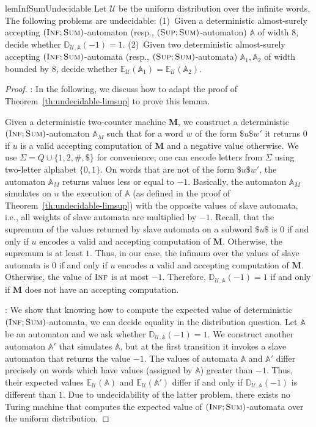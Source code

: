 \documentclass{lmcs}
\newcommand{\Paragraph}[1]{\noindent{\textbf{#1}}}
\newcommand{\nestedA}{\mathbb{A}}
\newcommand{\fsum}{\textsc{Sum}}
\newcommand{\fsup}{\textsc{Sup}}
\newcommand{\finf}{\textsc{Inf}}
\newcommand{\expected}{\mathbb{E}}
\newcommand{\distrib}{\mathbb{D}}
\newcommand{\calU}{\mathcal{U}}
\newcommand{\M}{\mathbf{M}}
\begin{document}
\begin{restatable}{lem}{InfSumUndecidable}\label{l:inf-prob-undec}
Let $\calU$ be the uniform distribution over the infinite words.
The following problems are undecidable:
(1)~Given a deterministic almost-surely accepting $(\finf; \fsum)$-automaton (resp., $(\fsup; \fsum)$-automaton) $\nestedA$ of width $8$, decide whether
$\distrib_{\calU, \nestedA}(-1) = 1$.
(2)~Given two deterministic almost-surely accepting $(\finf; \fsum)$-automata (resp., $(\fsup; \fsum)$-automata) $\nestedA_1, \nestedA_2$ of width bounded by $8$, decide whether
$\expected_{\calU}(\nestedA_1) = \expected_{\calU}(\nestedA_2)$.
\end{restatable}
\begin{proof}
\Paragraph{(1)}:
In the following, we discuss how to adapt the proof
of Theorem~\ref{th:undecidable-limsup} to prove this lemma.

Given a deterministic two-counter machine $\M$, we construct a deterministic $(\finf; \fsum)$-automaton $\nestedA_M$
such that for a word $w$ of the form $\$u\$ w'$ it returns $0$ if $u$ is a valid accepting computation of $\M$
and a negative value otherwise.
We use $\Sigma =  Q \cup \{ 1,2,\#,\$\}$ for convenience; one can encode letters from $\Sigma$ using two-letter alphabet $\{0,1\}$.
On words that are not of the form $\$u\$ w'$, the automaton $\nestedA_M$ returns values less or equal to $-1$.
Basically, the automaton $\nestedA_M$ simulates on $u$ the execution of $\nestedA$ (as defined in the proof of Theorem~\ref{th:undecidable-limsup}) with the opposite values of slave automata, i.e.,
all weights of slave automata are multiplied by $-1$.
Recall, that the supremum of the values returned by slave automata on a subword $\$u\$$
is $0$ if and only if $u$ encodes a valid and accepting computation of $\M$.
Otherwise, the supremum is at least $1$.
Thus, in our case, the infimum over the values of slave automata is $0$ if and only if $u$
encodes a valid and accepting computation of $\M$. Otherwise,
the value of $\finf$ is at most $-1$.
Therefore,  $\distrib_{\calU,\nestedA}(-1) = 1$ if and only if $\M$ does not have an accepting computation.

\Paragraph{(2)}: We show that knowing how to compute the expected value of deterministic
$(\finf; \fsum)$-automata, we can decide equality in the distribution question.
Let $\nestedA$ be an automaton and we ask whether $\distrib_{\calU,\nestedA}(-1) = 1$.
We construct another automaton $\nestedA'$ that simulates $\nestedA$, but at the first transition it invokes a slave automaton that returns the value $-1$.
The values of automata $\nestedA$ and $\nestedA'$ differ precisely on words which have values (assigned by $\nestedA$) greater than $-1$.
Thus, their expected values
$\expected_{\calU}(\nestedA)$ and $\expected_{\calU}(\nestedA')$ differ if and only if
$\distrib_{\calU,\nestedA}(-1)$ is different than $1$. Due to undecidability of the latter problem, there exists no Turing machine that computes the expected value of $(\finf;\fsum)$-automata
over the uniform distribution.
\end{proof}
\end{document}
